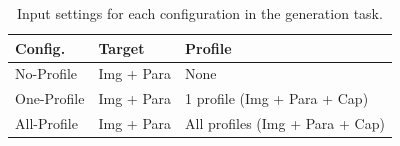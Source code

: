 \begin{table}[t]
\centering
\small
\begin{tabular}{lll}
\toprule
\textbf{Config.} & \textbf{Target} & \textbf{Profile} \\ \hline
\multicolumn{1}{l|}{No-Profile} & \multicolumn{1}{l|}{Img + Para} & None \\ \hline
\multicolumn{1}{l|}{One-Profile} & \multicolumn{1}{l|}{Img + Para} & 1 profile (Img + Para + Cap) \\ \hline
\multicolumn{1}{l|}{All-Profile} & \multicolumn{1}{l|}{Img + Para} & All profiles (Img + Para + Cap) \\ 
\bottomrule
\end{tabular}
\caption{Input settings for each configuration in the generation task.}
\label{tab:config}
\end{table}